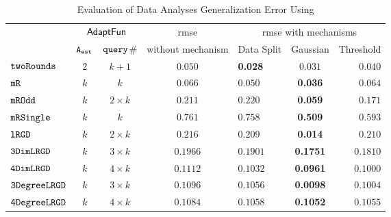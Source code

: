 {\footnotesize
\begin {table}[t]
        \vspace{-0.5cm}
        \caption{Evaluation of Data Analyses Generalization Error Using {\THESYSTEM}}
    \vspace{-0.4cm}
        \label{tb:adapt-generalization}
        \begin{center}
        \centering
{
        \begin{tabular}{|| >{\tiny}l || c | c || c || l | c | r ||  }
                \hhline{t|:======= :t:|}
        \multirow{2}{*}{Program $c$}
         & \multicolumn{2}{c||}{$\textsf{AdaptFun}$}
         & {rmse}
         & \multicolumn{3}{c||}{rmse with mechanisms} \\ 
         \hhline{||~--||~---||}
         & {${\mathtt{A_{est}}}$ } & {${\tt query}$\# } &  without mechanism & Data Split & Gaussian & Threshold  \\ 
         \hline \hline
        $  \mathtt{ twoRounds }$ & $ 2 $ & $  k + 1 $ & $0.050$   & {\textbf{0.028}} & {$0.031$} & $0.040$  \\
        \hhline{||-||--||-||---||}
         $  \mathtt{ mR}$ & $k$ & $k$ & $0.066$   & $0.050$ & {\textbf{0.036}} & $0.064$  \\
         \hhline{||-||--||-||---||}
         $  \mathtt{ mROdd }$ & $ k $ & $  2 \times k $ & $0.211$   & $0.220$ & {\textbf{0.059}} & $0.171$  \\
         \hhline{||-||--||-||---||}
         $  \mathtt{ mRSingle }$ & $ k $ & $  k $ & $ 0.761$   & $ 0.758$ & {\textbf{0.509}} & $ 0.593$  \\
         \hhline{||-||--||-||---||}
         $  \mathtt{ lRGD }$ & $ k $ & $  2\times k $ & $0.216$   & $0.209$ & \textbf{0.014} & $0.210$  \\
         \hhline{||-||--||-||---||}
         $  \mathtt{ 3DimLRGD }$ & $ k $ & $  3\times k $ & $0.1966$   & $0.1901$ & \textbf{0.1751} & $0.1810$  \\
         \hhline{||-||--||-||---||}
         $  \mathtt{ 4DimLRGD }$ & $ k $ & $  4\times k $ & $0.1112$   & $0.1032$ & \textbf{0.0961} & $0.1000$  \\
         \hhline{||-||--||-||---||}
         $  \mathtt{ 3DegreeLRGD }$ & $ k $ & $  3\times k $ & $0.1096$   & $0.1056$ & \textbf{0.0098} & $0.1004$  \\
         \hhline{||-||--||-||---||}
         $  \mathtt{ 4DegreeLRGD }$ & $ k $ & $  4\times k $ & $0.1084$   & $0.1058$ & \textbf{0.1052} & $0.1055$  \\

\end{tabular}}
\end{center}
\end{table}}

